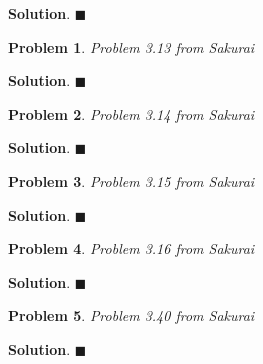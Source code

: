 \documentclass[12pt]{article}
\newtheorem{p}{Problem}
\theoremstyle{definition}
\newenvironment{s}{%
        \begin{trivlist} \item \textbf{Solution}. }{%
            \hspace*{\fill} $\blacksquare$\end{trivlist}}%
\begin{document}
{\begin{s}
\end{s}

\begin{p}
Problem 3.13 from Sakurai
\end{p}

\begin{s}
\end{s}

\begin{p}
Problem 3.14 from Sakurai
\end{p}

\begin{s}
\end{s}

\begin{p}
Problem 3.15 from Sakurai
\end{p}

\begin{s}
\end{s}

\begin{p}
Problem 3.16 from Sakurai
\end{p}

\begin{s}
\end{s}

\begin{p}
Problem 3.40 from Sakurai
\end{p}

\begin{s}
\end{s}
\end{document}
